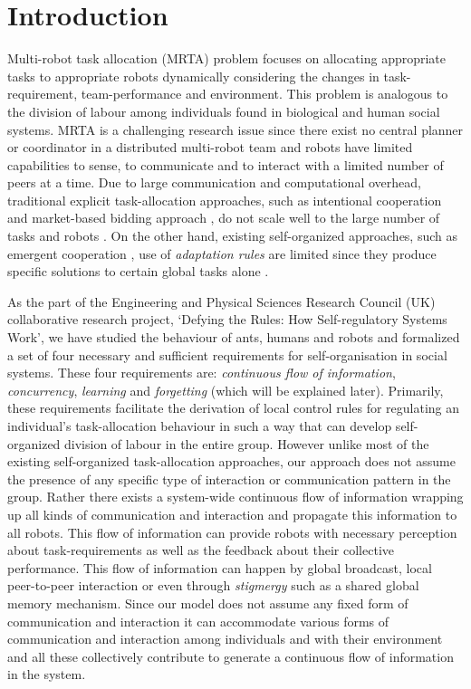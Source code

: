 \documentclass[smallcondensed]{svjour3}
\begin{document}
\section{Introduction}
\label{sec:intro}
Multi-robot task allocation (MRTA) problem focuses on allocating appropriate tasks to appropriate robots dynamically considering the changes in task-requirement, team-performance and environment. This problem is analogous to the division of labour among individuals found in biological and human social systems. MRTA is a challenging research issue since there exist no central planner or coordinator in a distributed multi-robot team and robots have limited capabilities to sense, to communicate and to interact with a limited number of peers at a time. Due to large communication and computational overhead, traditional explicit task-allocation approaches, such as intentional cooperation \citep{Parker2008} and market-based bidding approach \citep{Dias+2006},  do not scale well to the large number of tasks and robots \citep{Lerman+2006}. On the other hand, existing self-organized approaches, such as emergent cooperation \citep{Kube+1993}, use of {\em adaptation rules} \citep{Liu+2007} are limited since they produce specific solutions to certain global tasks alone \citep{Gerkey+2004}.

As the part of the Engineering and Physical Sciences Research Council (UK) collaborative  research project, `Defying the Rules: How Self-regulatory Systems Work', we have studied the behaviour of ants, humans and robots and formalized a set of four necessary and sufficient requirements for self-organisation in social systems. These four requirements are: \textit{continuous flow of information}, \textit{concurrency}, \textit{learning} and \textit{forgetting} (which will be explained later).  Primarily, these requirements facilitate the derivation of local control rules for regulating an individual's task-allocation behaviour in such a way that can develop self-organized division of labour in the entire group. However  unlike  most of the existing self-organized task-allocation approaches, our approach does not assume the presence of any specific type of interaction or communication pattern in the group. Rather there exists a system-wide continuous flow of information wrapping up all kinds of communication and interaction and propagate this information to all robots. This flow of information can provide robots with necessary perception about task-requirements as well as the feedback about their collective performance. This flow of information can happen by global broadcast, local peer-to-peer interaction or even through \textit{stigmergy} such as a shared global memory mechanism. Since our model does not assume any fixed form of communication and interaction it can accommodate various forms of communication and interaction among individuals and with their environment and all these collectively contribute to generate a continuous flow of information in the system.
\end{document}
